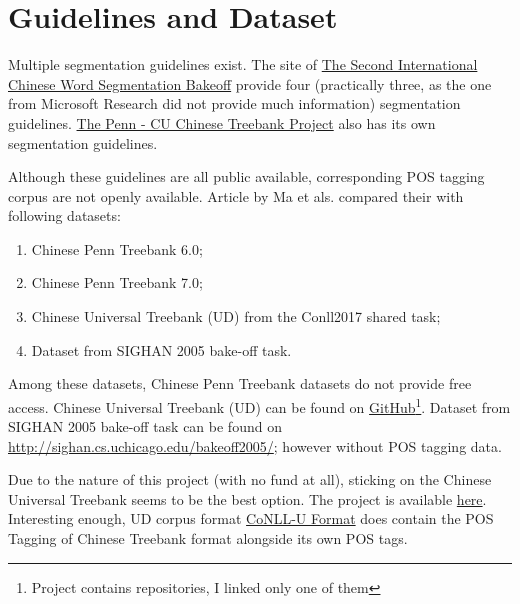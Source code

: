 \documentclass[11pt]{article}
\begin{document}
\section{Guidelines and Dataset}

\par Multiple segmentation guidelines exist. The site of \href{http://sighan.cs.uchicago.edu/bakeoff2005/}{The Second International Chinese Word Segmentation Bakeoff} provide four (practically three, as the one from Microsoft Research did not provide much information) segmentation guidelines. \href{https://verbs.colorado.edu/chinese/ctb.html}{The Penn - CU Chinese Treebank Project} also has its own segmentation guidelines\cite{xia2000segmentation}.

\par Although these guidelines are all public available, corresponding POS tagging corpus are not openly available. Article by Ma et als. \cite{ma2018state} compared their with following datasets:

\begin{enumerate}
    \item Chinese Penn Treebank 6.0;
    \item Chinese Penn Treebank 7.0;
    \item Chinese Universal Treebank (UD) from the Conll2017 shared task;
    \item Dataset from SIGHAN 2005 bake-off task.
\end{enumerate}

\par Among these datasets, Chinese Penn Treebank datasets do not provide free access. Chinese Universal Treebank (UD) can be found on \href{https://github.com/UniversalDependencies/UD_Chinese-GSD}{GitHub}\footnote{Project contains repositories, I linked only one of them}. Dataset from SIGHAN 2005 bake-off task can be found on \url{http://sighan.cs.uchicago.edu/bakeoff2005/}; however without POS tagging data.

\par Due to the nature of this project (with no fund at all), sticking on the Chinese Universal Treebank seems to be the best option. The project is available \href{https://universaldependencies.org/zh/index.html}{here}. Interesting enough, UD corpus format \href{https://universaldependencies.org/format.html}{CoNLL-U Format} does contain the POS Tagging of Chinese Treebank format alongside its own POS tags.



\end{document}
